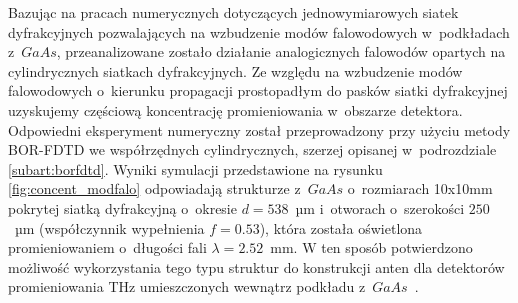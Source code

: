 Bazując na pracach numerycznych dotyczących  jednowymiarowych siatek dyfrakcyjnych pozwalających na wzbudzenie modów falowodowych w~podkładach z~$GaAs$, przeanalizowane zostało działanie analogicznych falowodów opartych na cylindrycznych siatkach dyfrakcyjnych. Ze względu na wzbudzenie modów falowodowych o~kierunku propagacji prostopadłym do pasków siatki dyfrakcyjnej uzyskujemy częściową koncentrację promieniowania w~obszarze detektora. Odpowiedni eksperyment numeryczny został przeprowadzony przy użyciu metody BOR-FDTD we współrzędnych cylindrycznych, szerzej opisanej w~podrozdziale \ref{subart:borfdtd}. Wyniki symulacji przedstawione na rysunku \ref{fig:concent_modfalo} odpowiadają strukturze z~$GaAs$ o~rozmiarach 10x10mm pokrytej siatką dyfrakcyjną o~okresie $d=538$~µm i~otworach o~szerokości $250$~µm (współczynnik wypełnienia $f=0.53$), która została oświetlona promieniowaniem o~długości fali $\lambda=2.52$~mm. W ten sposób potwierdzono możliwość wykorzystania tego typu struktur do konstrukcji anten dla detektorów promieniowania THz umieszczonych wewnątrz podkładu z~$GaAs$~\cite{Stolarek2011}.

